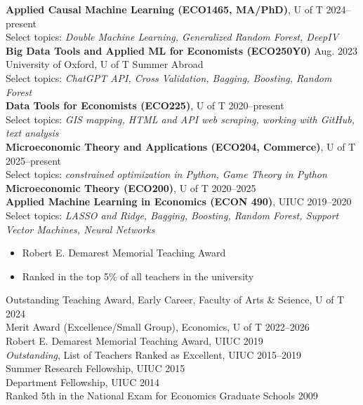 \documentclass[12pt, a4paper]{article}
\newcommand{\lineunder} {
	\vspace*{-8pt} \par
	\noindent\hspace*{-18pt} \hrulefill \par
}
\newcommand{\header} [1] {
	\par\noindent{\hspace*{-18pt}\vspace*{6pt} \textsc{#1}}
	\vspace*{-6pt} \par \lineunder
}
\begin{document}
\vspace{5mm}
 \header{Teaching}
 \vspace*{3pt}
 \textbf{Applied Causal Machine Learning (ECO1465, MA/PhD)}, U of T \hfill 2024--present\\
Select topics: \textit{Double Machine Learning, Generalized Random Forest, DeepIV} \\
 \vspace*{10pt}
\textbf{Big Data Tools and Applied ML for Economists (ECO250Y0)} \hfill Aug. 2023\\
University of Oxford, U of T Summer Abroad\\
Select topics: \textit{ChatGPT API, Cross Validation, Bagging, Boosting, Random Forest}\\
\vspace*{10pt}
\textbf{Data Tools for Economists (ECO225)}, U of T \hfill 2020--present\\
Select topics: \textit{GIS mapping, HTML and API web scraping, working with GitHub, text analysis} \\
\vspace*{10pt}
\textbf{Microeconomic Theory and Applications (ECO204, Commerce)}, U of T \hfill 2025--present\\
Select topics: \textit{constrained optimization in Python, Game Theory in Python}\\
\vspace*{10pt}
\textbf{Microeconomic Theory (ECO200)}, U of T \hfill 2020--2025\\
\vspace*{10pt}
\textbf{Applied Machine Learning in Economics (ECON 490)}, UIUC  \hfill  2019--2020\\
 Select topics: \textit{LASSO and Ridge, Bagging, Boosting, Random Forest, Support Vector Machines, Neural Networks}\\
 	\begin{itemize}
 	    \item[--] Robert E. Demarest Memorial Teaching Award
 	    \item[--] Ranked in the top 5\% of all teachers in the university
 	\end{itemize}{}

\vspace{5mm}
 \header{Honors and Awards}
 \vspace*{3pt}
Outstanding Teaching Award, Early Career, Faculty of Arts \& Science, U of T \hfill 2024\\
Merit Award (Excellence/Small Group), Economics, U of T \hfill  2022--2026\\
Robert E. Demarest Memorial Teaching Award, UIUC \hfill 2019\\
\textit{Outstanding}, List of Teachers Ranked as Excellent, UIUC \hfill  2015--2019\\
 Summer Research Fellowship, UIUC  \hfill  2015 \\
 Department Fellowship, UIUC \hfill  2014\\
 Ranked 5th in the National Exam for Economics Graduate Schools \hfill  2009\\
\end{document}

